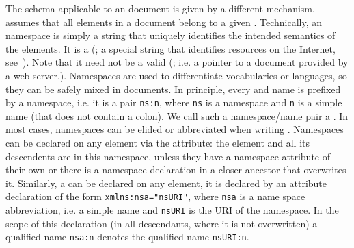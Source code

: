 The {\xml} schema applicable to an {\xml} document is given by a different
mechanism. {\xml} assumes that all elements in a document belong to a given
{}. Technically, an {\xml} namespace
is simply a string that uniquely identifies the intended semantics of the
elements.  It is a {} ({}; a
special string that identifies resources on the Internet, see~\cite{Harold:xb01}).
Note that it need not be a valid {} ({}; i.e.  a pointer to a document provided by a web server.).
Namespaces are used to differentiate {\xml} vocabularies or languages, so they can
be safely mixed in documents. In principle, every {} and
{} name is prefixed by a namespace, i.e. it is a pair
{\tt{ns:n}}, where {\tt{ns}} is a namespace and {\tt{n}} is a simple name (that
does not contain a colon). We call such a namespace/name pair a {}. In most cases, namespaces can be elided or
abbreviated when writing {\xml}.  Namespaces can be declared on any {\xml} element
via the {} attribute: the element and all its descendents are
in this namespace, unless they have a namespace attribute of their own or there is
a namespace declaration in a closer ancestor that overwrites it.  Similarly, a
{} can be declared on
any element, it is declared by an attribute declaration of the form
{\tt{xmlns:nsa="nsURI"}}, where {\tt{nsa}} is a name space abbreviation, i.e. a
simple name and {\tt{nsURI}} is the URI of the namespace.  In the scope of this
declaration (in all descendants, where it is not overwritten) a qualified name
{\tt{nsa:n}} denotes the qualified name {\tt{nsURI:n}}.

